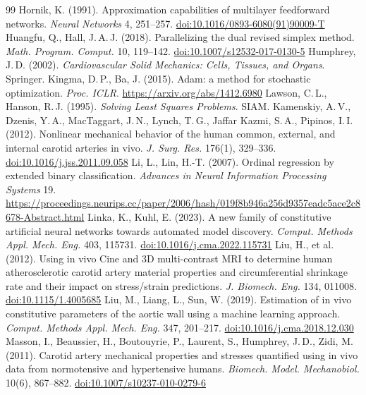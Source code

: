 \begin{thebibliography}{99}
 Hornik, K. (1991). Approximation capabilities of multilayer feedforward networks. \emph{Neural Networks} 4, 251--257. \href{https://doi.org/10.1016/0893-6080(91)90009-T}{doi:10.1016/0893-6080(91)90009-T}
 Huangfu, Q., Hall, J.\,A.\,J. (2018). Parallelizing the dual revised simplex method. \emph{Math. Program. Comput.} 10, 119--142. \href{https://doi.org/10.1007/s12532-017-0130-5}{doi:10.1007/s12532-017-0130-5}
 Humphrey, J.\,D. (2002). \emph{Cardiovascular Solid Mechanics: Cells, Tissues, and Organs}. Springer.
 Kingma, D.\,P., Ba, J. (2015). Adam: a method for stochastic optimization. \emph{Proc. ICLR}. \url{https://arxiv.org/abs/1412.6980}
 Lawson, C.\,L., Hanson, R.\,J. (1995). \emph{Solving Least Squares Problems}. SIAM.
 Kamenskiy, A.\,V., Dzenis, Y.\,A., MacTaggart, J.\,N., Lynch, T.\,G., Jaffar Kazmi, S.\,A., Pipinos, I.\,I. (2012). Nonlinear mechanical behavior of the human common, external, and internal carotid arteries in vivo. \emph{J. Surg. Res.} 176(1), 329--336. \href{https://doi.org/10.1016/j.jss.2011.09.058}{doi:10.1016/j.jss.2011.09.058}
 Li, L., Lin, H.-T. (2007). Ordinal regression by extended binary classification. \emph{Advances in Neural Information Processing Systems} 19. \url{https://proceedings.neurips.cc/paper/2006/hash/019f8b946a256d9357eadc5ace2c8678-Abstract.html}
 Linka, K., Kuhl, E. (2023). A new family of constitutive artificial neural networks towards automated model discovery. \emph{Comput. Methods Appl. Mech. Eng.} 403, 115731. \href{https://doi.org/10.1016/j.cma.2022.115731}{doi:10.1016/j.cma.2022.115731}
 Liu, H., et al. (2012). Using in vivo Cine and 3D multi-contrast MRI to determine human atherosclerotic carotid artery material properties and circumferential shrinkage rate and their impact on stress/strain predictions. \emph{J. Biomech. Eng.} 134, 011008. \href{https://doi.org/10.1115/1.4005685}{doi:10.1115/1.4005685}
 Liu, M., Liang, L., Sun, W. (2019). Estimation of in vivo constitutive parameters of the aortic wall using a machine learning approach. \emph{Comput. Methods Appl. Mech. Eng.} 347, 201--217. \href{https://doi.org/10.1016/j.cma.2018.12.030}{doi:10.1016/j.cma.2018.12.030}
 Masson, I., Beaussier, H., Boutouyrie, P., Laurent, S., Humphrey, J.\,D., Zidi, M. (2011). Carotid artery mechanical properties and stresses quantified using in vivo data from normotensive and hypertensive humans. \emph{Biomech. Model. Mechanobiol.} 10(6), 867--882. \href{https://doi.org/10.1007/s10237-010-0279-6}{doi:10.1007/s10237-010-0279-6}

\end{thebibliography}
